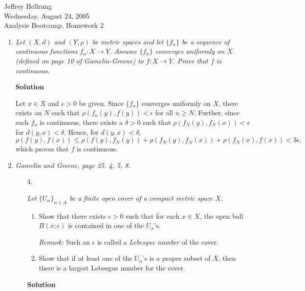 \documentclass{article}
\begin{document}
\begin{flushright}
Jeffrey Hellrung \\
Wednesday, August 24, 2005 \\
Analysis Bootcamp, Homework 2 \\
\end{flushright}


\begin{enumerate}

\item {\em Let \((X,d)\) and \((Y,\rho)\) be metric spaces and let \(\{f_n\}\) be a sequence of continuous functions \(f_n : X \to Y\).  Assume \(\{f_n\}\) converges uniformly on \(X\) (defined on page 10 of Gamelin-Greene) to \(f : X \to Y\).  Prove that \(f\) is continuous.}

{\bf Solution}

Let \(x \in X\) and \(\epsilon > 0\) be given.  Since \(\{f_n\}\) converges uniformly on \(X\), there exists an \(N\) such that \(\rho(f_n(y),f(y)) < \epsilon\) for all \(n \geq N\).  Further, since each \(f_n\) is continuous, there exists a \(\delta > 0\) such that \(\rho(f_N(y),f_N(x)) < \epsilon\) for \(d(y,x) < \delta\).  Hence, for \(d(y,x) < \delta\),
\[\rho(f(y),f(x)) \leq \rho(f(y),f_N(y)) + \rho(f_N(y),f_N(x)) + \rho(f_N(x),f(x)) < 3\epsilon,\]
which proves that \(f\) is continuous.



\item {\em Gamelin and Greene, page 25.  4, 5, 8.}

\begin{itemize}

\item[4.] {\em Let \(\{U_{\alpha}\}_{\alpha \in A}\) be a finite open cover of a compact metric space \(X\).

\begin{enumerate}
\item Show that there exists \(\epsilon > 0\) such that for each \(x \in X\), the open ball \(B(x;\epsilon)\) is contained in one of the \(U_{\alpha}\)'s.

{\em Remark:}  Such an \(\epsilon\) is called a {\em Lebesgue number} of the cover.
\item Show that if at least one of the \(U_{\alpha}\)'s is a proper subset of \(X\), then there is a largest Lebesgue number for the cover.
\end{enumerate}}

{\bf Solution}


\end{itemize}
\end{enumerate}
\end{document}
